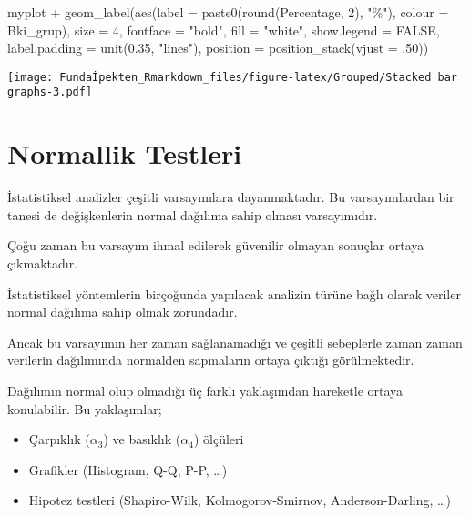 \documentclass[
]{article}
\newenvironment{Shaded}{\begin{snugshade}}{\end{snugshade}}
\newcommand{\AttributeTok}[1]{\textcolor[rgb]{0.77,0.63,0.00}{#1}}
\newcommand{\ConstantTok}[1]{\textcolor[rgb]{0.00,0.00,0.00}{#1}}
\newcommand{\DecValTok}[1]{\textcolor[rgb]{0.00,0.00,0.81}{#1}}
\newcommand{\FloatTok}[1]{\textcolor[rgb]{0.00,0.00,0.81}{#1}}
\newcommand{\FunctionTok}[1]{\textcolor[rgb]{0.00,0.00,0.00}{#1}}
\newcommand{\NormalTok}[1]{#1}
\newcommand{\SpecialCharTok}[1]{\textcolor[rgb]{0.00,0.00,0.00}{#1}}
\newcommand{\StringTok}[1]{\textcolor[rgb]{0.31,0.60,0.02}{#1}}
\providecommand{\tightlist}{%
  \setlength{\itemsep}{0pt}\setlength{\parskip}{0pt}}
\begin{document}
\begin{Shaded}
\begin{Highlighting}[]
\NormalTok{myplot }\SpecialCharTok{+} 
  \FunctionTok{geom\_label}\NormalTok{(}\FunctionTok{aes}\NormalTok{(}\AttributeTok{label =} \FunctionTok{paste0}\NormalTok{(}\FunctionTok{round}\NormalTok{(Percentage, }\DecValTok{2}\NormalTok{), }\StringTok{"\%"}\NormalTok{), }\AttributeTok{colour =}\NormalTok{ Bki\_grup), }
             \AttributeTok{size =} \DecValTok{4}\NormalTok{, }\AttributeTok{fontface =} \StringTok{"bold"}\NormalTok{, }\AttributeTok{fill =} \StringTok{"white"}\NormalTok{, }\AttributeTok{show.legend =} \ConstantTok{FALSE}\NormalTok{,}
             \AttributeTok{label.padding =} \FunctionTok{unit}\NormalTok{(}\FloatTok{0.35}\NormalTok{, }\StringTok{"lines"}\NormalTok{), }
             \AttributeTok{position =} \FunctionTok{position\_stack}\NormalTok{(}\AttributeTok{vjust =}\NormalTok{ .}\DecValTok{50}\NormalTok{))}
\end{Highlighting}
\end{Shaded}

\texttt{[image: Fundaİpekten\_Rmarkdown\_files/figure-latex/Grouped/Stacked bar graphs-3.pdf]}

\hypertarget{normallik-testleri}{%
\section{Normallik Testleri}\label{normallik-testleri}}

İstatistiksel analizler çeşitli varsayımlara dayanmaktadır. Bu
varsayımlardan bir tanesi de değişkenlerin normal dağılıma sahip olması
varsayımıdır.

Çoğu zaman bu varsayım ihmal edilerek güvenilir olmayan sonuçlar ortaya
çıkmaktadır.

İstatistiksel yöntemlerin birçoğunda yapılacak analizin türüne bağlı
olarak veriler normal dağılıma sahip olmak zorundadır.

Ancak bu varsayımın her zaman sağlanamadığı ve çeşitli sebeplerle zaman
zaman verilerin dağılımında normalden sapmaların ortaya çıktığı
görülmektedir.

Dağılımın normal olup olmadığı üç farklı yaklaşımdan hareketle ortaya
konulabilir. Bu yaklaşımlar;

\begin{itemize}
\tightlist
\item
  Çarpıklık (\(\alpha_3\)) ve basıklık (\(\alpha_4\)) ölçüleri
\item
  Grafikler (Histogram, Q-Q, P-P, \ldots)
\item
  Hipotez testleri (Shapiro-Wilk, Kolmogorov-Smirnov, Anderson-Darling,
  \ldots)
\end{itemize}
\end{document}

